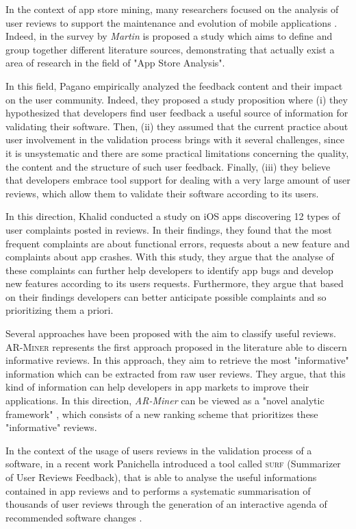 In the context of app store mining, many researchers focused on the analysis of user reviews to support the maintenance and evolution of mobile applications \cite{Martin:tse2017}.
Indeed, in the survey by \textit{Martin} \etal \cite{Martin:tse2017} is proposed a study which aims to define and group together different literature sources, demonstrating that actually exist a area of research in the field of "App Store Analysis".

In this field, Pagano \etal \cite{pagano} empirically analyzed the feedback content and their impact on the user community. 
Indeed, they proposed a study proposition where (i) they hypothesized that developers find user feedback a useful source of information for validating their software. Then, (ii) they assumed that the current practice about user involvement in the validation process brings with it several challenges, since it is unsystematic and there are some practical limitations concerning the quality, the content and the structure of such user feedback. 
Finally, (iii) they believe that developers embrace tool support for dealing with a very large amount of user reviews, which allow them to validate their software according to its users. 

In this direction, Khalid \etal \cite{Khalid:2015:IEEE} conducted a study on iOS apps discovering 12 types of user complaints posted in reviews. 
In their findings, they found that the most frequent complaints are about functional errors, requests about a new feature and complaints about app crashes. With this study, they argue that the analyse of these complaints can further help developers to identify app bugs and develop new features according to its users requests. 
Furthermore, they argue that based on their findings developers can better anticipate possible complaints and so prioritizing them a priori.   

Several approaches have been proposed with the aim to classify useful reviews.
\textsc{AR-Miner} \cite{Chen} represents the first approach proposed in the literature able to discern informative reviews. 
In this approach, they aim to retrieve the most "informative" information which can be extracted from raw user reviews. They argue, that this kind of information can help developers in app markets to improve their applications. In this direction, \textit{AR-Miner} can be viewed as a "novel analytic framework" \cite{Chen}, which consists of a new ranking scheme that prioritizes these "informative" reviews. 

In the context of the usage of users reviews in the validation process of a software, in a recent work Panichella \etal introduced a tool called \textsc{surf} (Summarizer of User Reviews Feedback), that is able to analyse the useful informations contained in app reviews and to performs a systematic summarisation of thousands of user reviews through the generation of an interactive agenda of recommended software changes 
\cite{sorbo}. 


